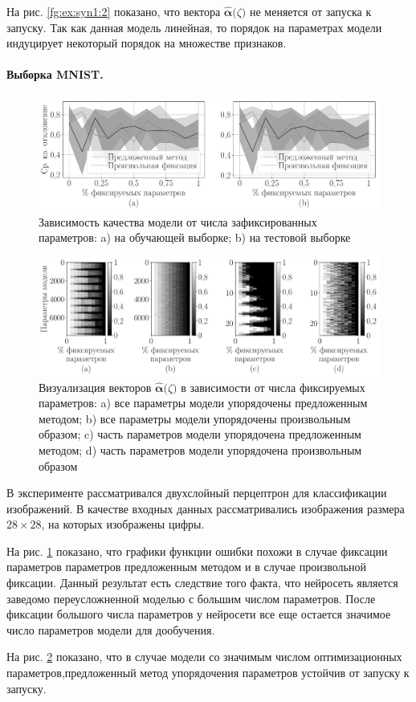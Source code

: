 На рис. \ref{fg:ex:syn1:2} показано, что вектора $\hat{\bm{\alpha}}\bigr(\zeta\bigr)$ не меняется от запуска к запуску. Так как данная модель линейная, то порядок на параметрах модели индуцирует некоторый порядок на множестве признаков.

\paragraph{Выборка MNIST.}

\begin{figure}[h!t]\center
\includegraphics[width=1\textwidth]{results/order/mnist_data_loss}
\caption{Зависимость качества модели от числа зафиксированных параметров: a) на обучающей выборке; b) на тестовой выборке}
\label{fg:ex:mnist:1}
\end{figure}

\begin{figure}[h!t]\center
\includegraphics[width=1\textwidth]{results/order/mnist_data_matshow}
\caption{Визуализация векторов $\hat{\bm{\alpha}}\bigr(\zeta\bigr)$ в зависимости от числа фиксируемых параметров: a) все параметры модели упорядочены предложенным методом; b) все параметры модели упорядочены произвольным образом; c) часть параметров модели упорядочена предложенным методом; d) часть параметров модели упорядочена произвольным образом}
\label{fg:ex:mnist:2}
\end{figure}

В эксперименте рассматривался двухслойный перцептрон для классификации изображений. В качестве входных данных рассматривались изображения размера $28\times28$, на которых изображены цифры. 

На рис. \ref{fg:ex:mnist:1} показано, что графики функции ошибки похожи в случае фиксации параметров параметров предложенным методом и в случае произвольной фиксации. Данный результат есть следствие того факта, что нейросеть является заведомо переусложненной моделью с большим числом параметров. После фиксации большого числа параметров у нейросети все еще остается значимое число параметров модели для дообучения.

На рис. \ref{fg:ex:mnist:2} показано, что в случае модели со значимым числом оптимизационных параметров,предложенный метод упорядочения параметров устойчив от запуску к запуску.

